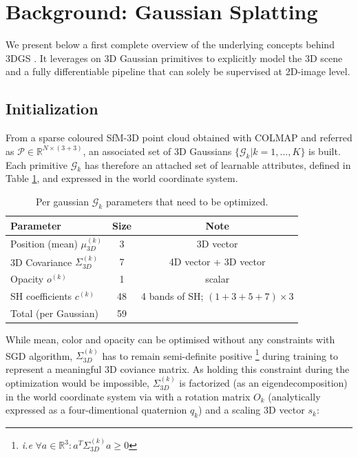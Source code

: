 \section{Background: Gaussian Splatting}
We present below a first complete overview of the underlying concepts behind 3D\ac{GS} \citep{kerbl20233d}. It leverages on 3D Gaussian primitives to explicitly model the 3D scene and a fully differentiable pipeline that can solely be supervised at 2D-image level. 

\subsection{Initialization} From a sparse coloured \ac{SfM}-3D point cloud obtained with COLMAP and referred as $\mathcal{P}\in\mathbb{R}^{N\times(3+3)}$, an associated set of 3D Gaussians $\{\mathcal{G}_{k}|k=1,...,K\}$ is built. Each primitive $\mathcal{G}_{k}$ has therefore an attached set of learnable attributes, defined in Table \ref{tab:gauss-param}, and expressed in the world coordinate system.

\begin{table}[h!]
  \centering
   \caption{Per gaussian $\mathcal{G}_{k} $  parameters that need to be optimized.}
  \begin{tabular}{lcc}
  \hline
  Parameter  & Size & Note \\
  \hline
  Position (mean)  $\mu^{(k)}_{3D}$ & 3 & 3D vector  \\
  3D Covariance $\Sigma^{(k)}_{3D}$ & 7 & 4D vector + 3D vector \\
  Opacity  $o^{(k)}$ & 1 & scalar \\
  SH coefficients  $c^{(k)}$ & 48 & 4 bands of \ac{SH}; $(1+3+5+7)\times3$ \\
  \hline
  Total (per Gaussian)  & 59 & \\
  \hline
  \end{tabular}
 
  \label{tab:gauss-param}
\end{table}

While mean, color and opacity can be optimised without any constraints with \ac{SGD} algorithm, $\Sigma^{(k)}_{3D}$ has to remain semi-definite positive \footnote{\textit{i.e} $ \forall a \in \mathbb{R}^{3}: a^{T}\Sigma^{(k)}_{3D}a \geq 0$} during training to represent a meaningful 3D coviance matrix. As holding this constraint during the optimization would be impossible, $\Sigma^{(k)}_{3D}$ is factorized (as an eigendecomposition) in the world coordinate system via with a rotation matrix $O_{k}$ (analytically expressed as a four-dimentional quaternion $q_{k}$) and a scaling 3D vector $s_{k}$: 

